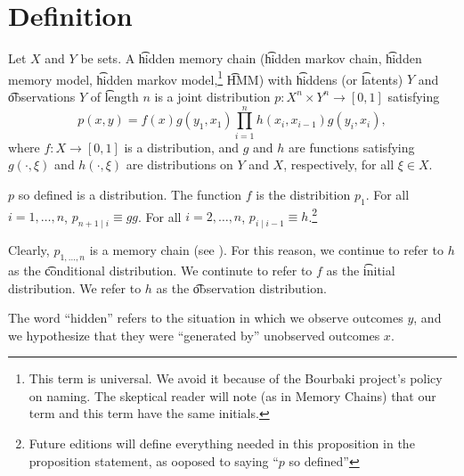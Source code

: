 

\section*{Definition}

Let $X$ and $Y$ be sets.
A \t{hidden memory chain} (\t{hidden markov chain}, \t{hidden memory model}, \t{hidden markov model},\footnote{This term is universal.
We avoid it because of the Bourbaki project's policy on naming.
The skeptical reader will note (as in  {Memory Chains}) that our term and this term have the same initials.}
\t{HMM}) with \t{hiddens} (or \t{latents}) $Y$ and \t{observations} $Y$ of \t{length} $n$ is a joint distribution $p: X^n \times Y^n \to [0, 1]$ satisfying
\[
p(x, y) = f(x)g(y_1, x_1)\prod_{i = 1}^{n} h(x_i, x_{i-1}) g(y_i, x_i),
\]
where $f: X \to [0, 1]$ is a distribution, and $g$ and $h$ are functions satisfying $g(\cdot , \xi )$ and $h(\cdot , \xi )$ are distributions on $Y$ and $X$, respectively, for all $\xi \in X$.
\begin{proposition}
$p$ so defined is a distribution.
The function $f$ is the distribition $p_{1}$.
For all $i = 1, \dots , n$, $p_{n+1 \mid i} \equiv gg$.
For all $i = 2, \dots , n$, $p_{i \mid i-1} \equiv h$.\footnote{Future editions will define everything needed in this proposition in the proposition statement, as ooposed to saying ``$p$ so defined''}
\end{proposition}


Clearly, $p_{1, \dots , n}$ is a memory chain (see ).
For this reason, we continue to refer to $h$ as the \t{conditional distribution}.
We continute to refer to $f$ as the \t{initial distribution}.
We refer to $h$ as the \t{observation distribution}.

The word ``hidden'' refers to the situation in which we observe outcomes $y$, and we hypothesize that they were ``generated by'' unobserved outcomes $x$.

\blankpage